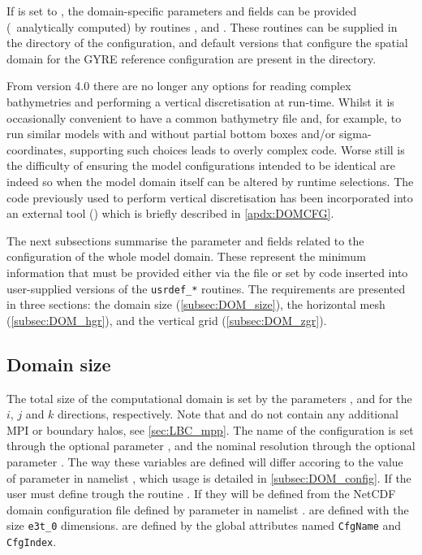 \documentclass[../main/NEMO_manual]{subfiles}
\begin{document}
If  is set to ,
the domain-specific parameters and fields can be provided (\eg\ analytically computed) by
routines ,  and .
These routines can be supplied in the  directory of the configuration,
and default versions that configure the spatial domain for the GYRE reference configuration are
present in the  directory.

From version 4.0 there are no longer any options for reading complex bathymetries and
performing a vertical discretisation at run-time.
Whilst it is occasionally convenient to have a common bathymetry file and, for example,
to run similar models with and without partial bottom boxes and/or sigma-coordinates,
supporting such choices leads to overly complex code.
Worse still is the difficulty of ensuring the model configurations intended to be identical are
indeed so when the model domain itself can be altered by runtime selections.
The code previously used to perform vertical discretisation has been incorporated into
an external tool () which is briefly described in \autoref{apdx:DOMCFG}.

The next subsections summarise the parameter and fields related to
the configuration of the whole model domain.
These represent the minimum information that must be provided either via
the  file or
set by code inserted into user-supplied versions of the \texttt{usrdef\_*} routines.
The requirements are presented in three sections:
the domain size (\autoref{subsec:DOM_size}), the horizontal mesh (\autoref{subsec:DOM_hgr}),
and the vertical grid (\autoref{subsec:DOM_zgr}).

\subsection{Domain size}
\label{subsec:DOM_size}

The total size of the computational domain is set by the parameters ,  and
 for the $i$, $j$ and $k$ directions, respectively. Note that  and  do not contain any additional MPI or boundary halos, see \autoref{sec:LBC_mpp}. The name of the configuration is set through the optional parameter , and the nominal resolution through the optional parameter .
The way these variables are defined will differ accoring to the value of  parameter in
namelist , which usage is detailed in \autoref{subsec:DOM_config}. If  the user must define  trough the routine . If  they will be defined from the NetCDF domain configuration file defined by  parameter in namelist .  are defined with the size  \texttt{e3t\_0} dimensions.  are defined by the global attributes named \texttt{CfgName} and \texttt{CfgIndex}.
\end{document}
